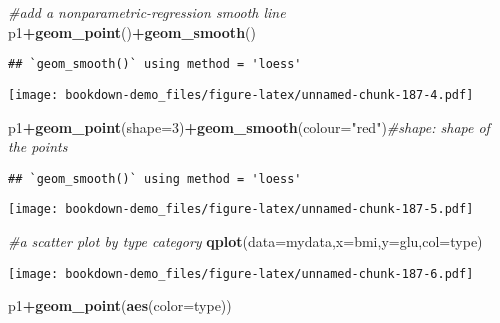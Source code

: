 \documentclass[]{book}
\newenvironment{Shaded}{\begin{snugshade}}{\end{snugshade}}
\newcommand{\KeywordTok}[1]{\textcolor[rgb]{0.13,0.29,0.53}{\textbf{#1}}}
\newcommand{\DataTypeTok}[1]{\textcolor[rgb]{0.13,0.29,0.53}{#1}}
\newcommand{\DecValTok}[1]{\textcolor[rgb]{0.00,0.00,0.81}{#1}}
\newcommand{\StringTok}[1]{\textcolor[rgb]{0.31,0.60,0.02}{#1}}
\newcommand{\CommentTok}[1]{\textcolor[rgb]{0.56,0.35,0.01}{\textit{#1}}}
\newcommand{\OperatorTok}[1]{\textcolor[rgb]{0.81,0.36,0.00}{\textbf{#1}}}
\newcommand{\NormalTok}[1]{#1}
\theoremstyle{definition}
\theoremstyle{definition}
\theoremstyle{definition}
\theoremstyle{remark}
\begin{document}
\begin{Shaded}
\begin{Highlighting}[]
\CommentTok{#add a nonparametric-regression smooth line}
\NormalTok{p1}\OperatorTok{+}\KeywordTok{geom_point}\NormalTok{()}\OperatorTok{+}\KeywordTok{geom_smooth}\NormalTok{()}
\end{Highlighting}
\end{Shaded}

\begin{verbatim}
## `geom_smooth()` using method = 'loess'
\end{verbatim}

\texttt{[image: bookdown-demo\_files/figure-latex/unnamed-chunk-187-4.pdf]}

\begin{Shaded}
\begin{Highlighting}[]
\NormalTok{p1}\OperatorTok{+}\KeywordTok{geom_point}\NormalTok{(}\DataTypeTok{shape=}\DecValTok{3}\NormalTok{)}\OperatorTok{+}\KeywordTok{geom_smooth}\NormalTok{(}\DataTypeTok{colour=}\StringTok{"red"}\NormalTok{)}\CommentTok{#shape: shape of the points}
\end{Highlighting}
\end{Shaded}

\begin{verbatim}
## `geom_smooth()` using method = 'loess'
\end{verbatim}

\texttt{[image: bookdown-demo\_files/figure-latex/unnamed-chunk-187-5.pdf]}

\begin{Shaded}
\begin{Highlighting}[]
\CommentTok{#a scatter plot by type category}
\KeywordTok{qplot}\NormalTok{(}\DataTypeTok{data=}\NormalTok{mydata,}\DataTypeTok{x=}\NormalTok{bmi,}\DataTypeTok{y=}\NormalTok{glu,}\DataTypeTok{col=}\NormalTok{type)}
\end{Highlighting}
\end{Shaded}

\texttt{[image: bookdown-demo\_files/figure-latex/unnamed-chunk-187-6.pdf]}

\begin{Shaded}
\begin{Highlighting}[]
\NormalTok{p1}\OperatorTok{+}\KeywordTok{geom_point}\NormalTok{(}\KeywordTok{aes}\NormalTok{(}\DataTypeTok{color=}\NormalTok{type))}
\end{Highlighting}
\end{Shaded}
\end{document}
